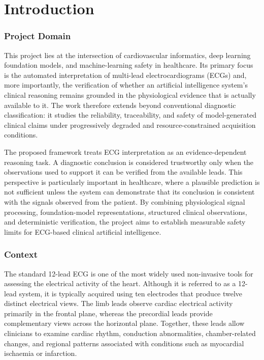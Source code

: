 \documentclass{ssnreview}
\begin{document}
\chapter{Introduction}

\subsection*{Project Domain}

This project lies at the intersection of cardiovascular informatics, deep learning
foundation models, and machine-learning safety in healthcare. Its primary focus is the
automated interpretation of multi-lead electrocardiograms (ECGs) and, more importantly,
the verification of whether an artificial intelligence system's clinical reasoning remains
grounded in the physiological evidence that is actually available to it. The work therefore
extends beyond conventional diagnostic classification: it studies the reliability,
traceability, and safety of model-generated clinical claims under progressively degraded
and resource-constrained acquisition conditions.

The proposed framework treats ECG interpretation as an evidence-dependent reasoning
task. A diagnostic conclusion is considered trustworthy only when the observations used
to support it can be verified from the available leads. This perspective is particularly
important in healthcare, where a plausible prediction is not sufficient unless the system
can demonstrate that its conclusion is consistent with the signals observed from the
patient. By combining physiological signal processing, foundation-model representations,
structured clinical observations, and deterministic verification, the project aims to
establish measurable safety limits for ECG-based clinical artificial intelligence.

\subsection*{Context}

The standard 12-lead ECG is one of the most widely used non-invasive tools for assessing
the electrical activity of the heart. Although it is referred to as a 12-lead system, it is
typically acquired using ten electrodes that produce twelve distinct electrical views.
The limb leads observe cardiac electrical activity primarily in the frontal plane, whereas
the precordial leads provide complementary views across the horizontal plane. Together,
these leads allow clinicians to examine cardiac rhythm, conduction abnormalities,
chamber-related changes, and regional patterns associated with conditions such as
myocardial ischaemia or infarction.
\end{document}
